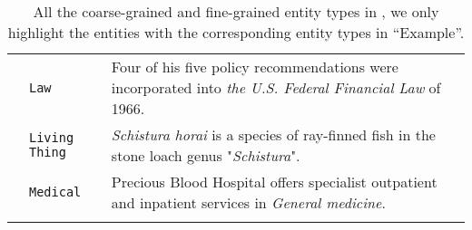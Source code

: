 \documentclass[11pt,a4paper, dvipsnames]{article}
\begin{document}
\begin{longtable}{clp{9.5cm}}
                                              & \texttt{\color{Brown}Law}                 & Four of his five policy recommendations were incorporated into \textit{\color{Brown}the U.S. Federal Financial Law} of 1966.                                         \\ \cmidrule(r){2-2} \cmidrule(r){3-3}
                                              & \texttt{\color{Brown}Living Thing}       & \textit{\color{Brown}Schistura horai} is a species of ray-finned fish in the stone loach genus "\textit{\color{Brown}Schistura}".                                                    \\ \cmidrule(r){2-2} \cmidrule(r){3-3}
                                              & \texttt{\color{Brown}Medical}             & Precious Blood Hospital offers specialist outpatient and inpatient services in \textit{\color{Brown}General medicine}.   \\ \bottomrule       
                                              
\caption{All the coarse-grained and fine-grained entity types in , we only highlight the entities with the corresponding entity types in ``Example''.}
\end{longtable}
\end{document}
